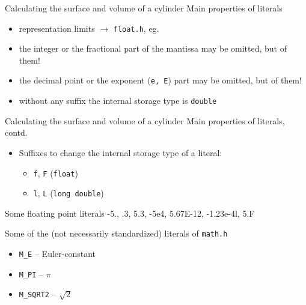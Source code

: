 \documentclass[usenames,dvipsnames,aspectratio=169]{beamer}
\begin{document}
\begin{frame}{Calculating the surface and volume of a cylinder}
  Main properties of  literals
  \begin{itemize}
    \item representation limits $\to$ \texttt{float.h}, eg. 
    \item the integer or the fractional part of the mantissa may be omitted, but  of them!
    \item the decimal point or the exponent (\texttt{e, E}) part may be omitted, but  of them!
    \item without any suffix the internal storage type is \texttt{double}
  \end{itemize}
\end{frame}

\begin{frame}{Calculating the surface and volume of a cylinder}
  Main properties of  literals, contd.
  \begin{itemize}
    \item Suffixes to change the internal storage type of a literal:
    \begin{itemize}
      \item \texttt{f}, \texttt{F} (\texttt{float})
      \item \texttt{l}, \texttt{L} (\texttt{long double})
    \end{itemize}
  \end{itemize}
  \begin{exampleblock}{Some floating point literals}
    -5., .3, 5.3, -5e4, 5.67E-12, -1.23e-4l, 5.F
  \end{exampleblock}
  Some of the (not necessarily standardized) literals of \texttt{math.h}
  \begin{itemize}
    \item \texttt{M\_E} -- Euler-constant
    \item \texttt{M\_PI} -- $\pi$
    \item \texttt{M\_SQRT2} -- $\sqrt{2}$
  \end{itemize}
\end{frame}
\end{document}
